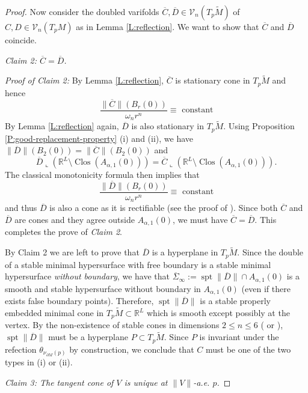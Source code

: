\documentclass[10pt]{amsart}
\theoremstyle{definition}
\theoremstyle{remark}
\numberwithin{equation}{section}
\newcommand{\al}{\alpha}
\newcommand{\V}{\mathcal{V}}
\newcommand{\R}{\mathbb{R}}
\newcommand{\lc}{\llcorner}
\newcommand{\Si}{\Sigma}
\newcommand{\tM}{\widetilde{M}}
\newcommand{\spt}{\operatorname{spt}}
\newcommand{\Clos}{\operatorname{Clos}}
\begin{document}
\begin{proof}
Now consider the doubled varifolds $\overline{C}, \overline{D} \in \V_n(T_p\tM)$ 
of $C,D \in \V_n(T_pM)$ as in Lemma \ref{L:reflection}. We want to show that $\overline{C}$ and $\overline{D}$ coincide.

\vspace{.3cm}

\textit{Claim 2: $\overline{C}=\overline{D}$.}

\vspace{.3cm}

\textit{Proof of Claim 2:} 
By Lemma \ref{L:reflection}, $\overline{C}$ is stationary cone in $T_p \tM$ and hence
\[ \frac{\|\overline{C}\|(B_r(0))}{\omega_n r^n} \equiv \text{ constant}\]
By Lemma \ref{L:reflection} again, $\overline{D}$ is also stationary in $T_p \tM$. Using Proposition \ref{P:good-replacement-property} (i) and (ii), we have $\|\overline{D}\|(B_2(0))=\|\overline{C}\|(B_2(0))$ and 
\[ \overline{D}\lc (\mathbb{R}^L \setminus \Clos(A_{\al, 1}(0)))=\overline{C}\lc (\R^{L}\setminus \Clos(A_{\al, 1}(0))).\]
The classical monotonicity formula then implies that 
\[ \frac{\|\overline{D}\|(B_r(0))}{\omega_n r^n} \equiv \text{ constant}\]
and thus $\overline{D}$ is also a cone as it is rectifiable (see the proof of \cite[Theorem 19.3]{Simon}). Since both $\overline{C}$ and $\overline{D}$ are cones and they agree outside $A_{\al,1}(0)$, we must have $\overline{C}=\overline{D}$. This completes the prove of \emph{Claim 2}.

By Claim 2 we are left to prove that $\overline{D}$ is a hyperplane in $T_p\tM$. Since the double of a stable minimal hypersurface with free boundary is a stable minimal hypersurface \emph{without boundary}, we have that $\overline{\Si}_\infty:=\spt \|\overline{D}\| \cap A_{\al,1}(0)$ is a smooth and stable hypersurface without boundary in $A_{\al, 1}(0)$ (even if there exists false boundary points). Therefore, $\spt \| \overline{D}\|$ is a stable properly embedded minimal cone in $T_p \tM \subset \R^L$ which is smooth except possibly at the vertex. By the non-existence of stable cones in dimensions $2 \leq n \leq 6$ (\cite{Simons} or \cite[Theorem 7.6]{Pitts}), $\spt \| \overline{D}\|$ must be a hyperplane $P \subset T_p \tM$. Since $P$ is invariant under the refection $\theta_{\nu_{\partial M}(p)}$ by construction, we conclude that $C$ must be one of the two types in (i) or (ii).

\vspace{.3cm}

\textit{Claim 3: The tangent cone of $V$ is unique at $\|V\|$-a.e. $p$.}


\end{proof}
\end{document}
